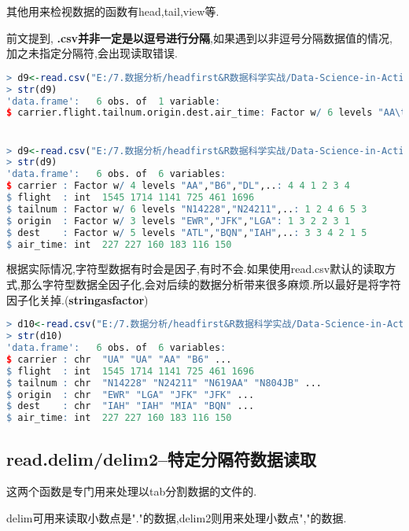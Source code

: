 \documentclass[11pt,a4paper,oneside]{book}
\begin{document}
其他用来检视数据的函数有head,tail,view等.

前文提到, \textbf{.csv并非一定是以逗号进行分隔},如果遇到以非逗号分隔数据值的情况,加之未指定分隔符,会出现读取错误.

\begin{lstlisting}[language=r]
> d9<-read.csv("E:/7.数据分析/headfirst&R数据科学实战/Data-Science-in-Action-R-Tools-and-Case-Studies-master/chapter1/RawData/flights1.csv",header=TRUE)
> str(d9)
'data.frame':	6 obs. of  1 variable:
$ carrier.flight.tailnum.origin.dest.air_time: Factor w/ 6 levels "AA\t1141\tN619AA\tJFK\tMIA\t160",..: 4 6 1 2 3 5


> d9<-read.csv("E:/7.数据分析/headfirst&R数据科学实战/Data-Science-in-Action-R-Tools-and-Case-Studies-master/chapter1/RawData/flights1.csv",sep="\t",header=TRUE)
> str(d9)
'data.frame':	6 obs. of  6 variables:
$ carrier : Factor w/ 4 levels "AA","B6","DL",..: 4 4 1 2 3 4
$ flight  : int  1545 1714 1141 725 461 1696
$ tailnum : Factor w/ 6 levels "N14228","N24211",..: 1 2 4 6 5 3
$ origin  : Factor w/ 3 levels "EWR","JFK","LGA": 1 3 2 2 3 1
$ dest    : Factor w/ 5 levels "ATL","BQN","IAH",..: 3 3 4 2 1 5
$ air_time: int  227 227 160 183 116 150
\end{lstlisting}

根据实际情况,字符型数据有时会是因子,有时不会.如果使用read.csv默认的读取方式,那么字符型数据全因子化,会对后续的数据分析带来很多麻烦.所以最好是将字符因子化关掉.(\textbf{stringasfactor})
\begin{lstlisting}[language=r]
> d10<-read.csv("E:/7.数据分析/headfirst&R数据科学实战/Data-Science-in-Action-R-Tools-and-Case-Studies-master/chapter1/RawData/flights1.csv",stringsAsFactors=F,sep="\t",header=TRUE)
> str(d10)
'data.frame':	6 obs. of  6 variables:
$ carrier : chr  "UA" "UA" "AA" "B6" ...
$ flight  : int  1545 1714 1141 725 461 1696
$ tailnum : chr  "N14228" "N24211" "N619AA" "N804JB" ...
$ origin  : chr  "EWR" "LGA" "JFK" "JFK" ...
$ dest    : chr  "IAH" "IAH" "MIA" "BQN" ...
$ air_time: int  227 227 160 183 116 150
\end{lstlisting}

\subsection{read.delim/delim2--特定分隔符数据读取}
这两个函数是专门用来处理以tab分割数据的文件的.

delim可用来读取小数点是"."的数据,delim2则用来处理小数点","的数据.
\end{document}
